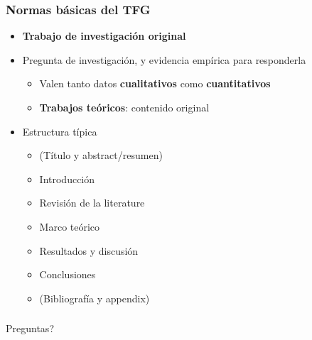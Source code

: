 \documentclass[aspectratio=43]{beamer}
\begin{document}
\begin{frame}
\frametitle{Normas básicas del TFG}
\centering

\begin{itemize}
  \item \textbf{Trabajo de investigación original}
  \item Pregunta de investigación, y evidencia empírica para responderla
  \begin{itemize}
    \item Valen tanto datos \textbf{cualitativos} como \textbf{cuantitativos}
    \item \textbf{Trabajos teóricos}: contenido original
  \end{itemize}
  \item Estructura típica
  \begin{itemize}
    \item (Título y abstract/resumen)
    \item Introducción
    \item Revisión de la literature
    \item Marco teórico
    \item Resultados y discusión
    \item Conclusiones
    \item (Bibliografía y appendix)
  \end{itemize}
\end{itemize}

\end{frame}

\begin{frame}
\frametitle{}
\centering

Preguntas?

\end{frame}

\end{document}
